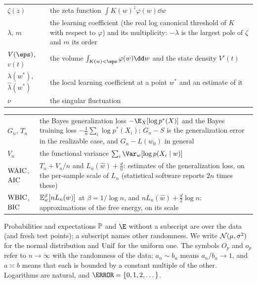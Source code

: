 
\begin{tabular}{@{}p{}p{}@{}}
$\zeta(z)$ & the zeta function $\int K(w)^z\varphi(w)\dd w$ \\
$\lambda$, $m$ & the learning coefficient (the real log canonical threshold of $K$ with respect to $\varphi$) and its multiplicity: $-\lambda$ is the largest pole of $\zeta$ and $m$ its order \\
$V(\eps)$, $v(t)$ & the volume $\int_{K(w)<\eps}\varphi(w)\dd w$ and the state density $V'(t)$ \\
$\lambda(w^*)$, $\hat\lambda(w^*)$ & the local learning coefficient at a point $w^*$ and an estimate of it \\
$\nu$ & the singular fluctuation
\end{tabular}


\begin{tabular}{@{}p{}p{}@{}}
$G_n$, $T_n$ & the Bayes generalization loss $-\E_X[\log p^*(X)]$ and the Bayes training loss $-\frac1n\sum_i\log p^*(X_i)$; $G_n-S$ is the generalization error in the realizable case, and $G_n-L(w_0)$ in general \\
$V_n$ & the functional variance $\sum_i\Var_w[\log p(X_i\mid w)]$ \\
$\operatorname{WAIC}$, $\operatorname{AIC}$ & $T_n+V_n/n$ and $L_n(\hat w)+\frac dn$: estimates of the generalization loss, on the per-sample scale of $L_n$ (statistical software reports $2n$ times these) \\
$\operatorname{WBIC}$, $\operatorname{BIC}$ & $\mathbb{E}^{\beta}_{w}\!\left[nL_n(w)\right]$ at $\beta=1/\log n$, and $nL_n(\hat w)+\frac d2\log n$: approximations of the free energy, on its scale
\end{tabular}


Probabilities and expectations $\mathbb{P}$ and $\E$ without a subscript are over the data (and fresh test points); a subscript names other randomness. We write $\mathcal{N}(\mu,\sigma^2)$ for the normal distribution and $\operatorname{Unif}$ for the uniform one. The symbols $O_p$ and $o_p$ refer to $n\to\infty$ with the randomness of the data; $a_n\sim b_n$ means $a_n/b_n\to1$, and $a\asymp b$ means that each is bounded by a constant multiple of the other. Logarithms are natural, and $\N=\{0,1,2,\dots\}$.
